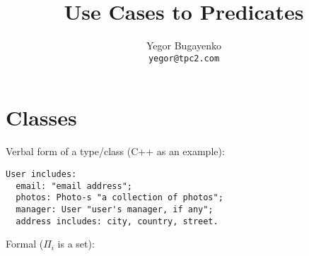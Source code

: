\documentclass{article}
\begin{document}
\setlength{\parindent}{0pt}
\setlength{\parskip}{1em}
\newcommand{\type}[1]{\mbox{\texttt{#1}}}
\newenvironment{maths}
{
    \vspace*{0.5em}
    \begin{tabular}{l}
}
{
    \end{tabular}
    \vspace*{1em}
}

\title{Use Cases to Predicates}
\author{Yegor Bugayenko\\\texttt{yegor@tpc2.com}}
\maketitle

\newpage
\section{Classes}

    Verbal form of a type/class (C++ as an example):

    \begin{verbatim}
User includes:
  email: "email address";
  photos: Photo-s "a collection of photos";
  manager: User "user's manager, if any";
  address includes: city, country, street.\end{verbatim}

    Formal ($\Pi_i$ is a set):
    
\end{document}
